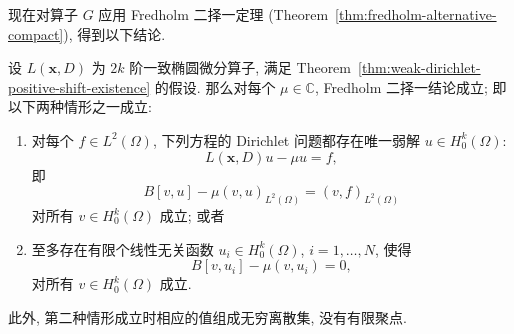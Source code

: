 现在对算子 $G$ 应用 Fredholm 二择一定理 (Theorem~\ref{thm:fredholm-alternative-compact}), 得到以下结论.

\begin{Theorem}
\label{thm:elliptic-fredholm-alternative}
设 $L(\bm{x},D)$ 为 $2k$ 阶一致椭圆微分算子, 满足 Theorem~\ref{thm:weak-dirichlet-positive-shift-existence} 的假设. 那么对每个 $\mu\in\mathbb{C}$, Fredholm 二择一结论成立; 即以下两种情形之一成立:\begin{enumerate}\item 对每个 $f\in L^2(\Omega)$, 下列方程的 Dirichlet 问题都存在唯一弱解 $u\in H_0^k(\Omega)$:
\begin{equation}\label{eq:elliptic-fredholm-inhomogeneous-equation}
L(\bm{x},D)u-\mu u=f,
\end{equation}
即
\begin{equation}\label{eq:elliptic-fredholm-inhomogeneous-weak-equation}
B[v,u]-\mu(v,u)_{L^2(\Omega)}=(v,f)_{L^2(\Omega)}
\end{equation}
对所有 $v\in H_0^k(\Omega)$ 成立; 或者\item 至多存在有限个线性无关函数 $u_i\in H_0^k(\Omega)$, $i=1,\ldots,N$, 使得
\begin{equation}\label{eq:elliptic-fredholm-homogeneous-weak-equations}
B[v,u_i]-\mu(v,u_i)=0,
\end{equation}
对所有 $v\in H_0^k(\Omega)$ 成立.\end{enumerate}此外, 第二种情形成立时相应的值组成无穷离散集, 没有有限聚点.
\end{Theorem}

